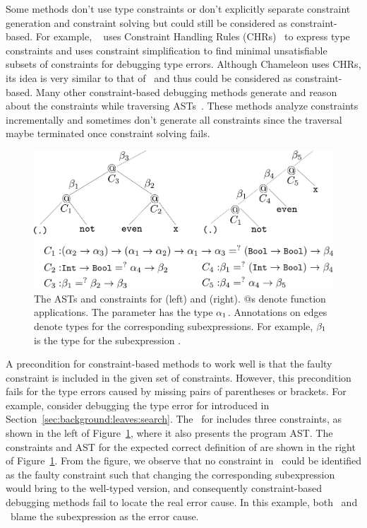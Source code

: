 \documentclass[12pt]{report}	%
\begin{document}
Some methods don't use type constraints or don't
explicitly separate constraint generation and constraint
solving but could still be considered as
constraint-based. For example,
\toolCh~\cite{Stuckey03:ITD,Stuckey04:ITE,Wazny06:TIT}
uses Constraint Handling Rules (CHRs)~\cite{CHR}
to express type constraints and uses constraint
simplification to find minimal unsatisfiable
subsets of constraints for debugging type errors.
Although Chameleon uses CHRs, its idea is very
similar to that of \toolMin\ and thus could be considered
as constraint-based. Many other constraint-based debugging methods
generate and reason about the constraints while traversing
ASTs~\cite{Lee98:PAF,Lee00:GLP,Mcadam98:UST,Yang00:ETE,Wand86:FST,Duggan95:ETI,Chitil01:CET}.
%
These methods analyze constraints incrementally and
sometimes don't generate all constraints since the traversal
maybe terminated once constraint solving fails. 

\begin{figure}
\centering
\includegraphics[width=0.85\columnwidth]{images/nonstruc.pdf}
\caption[Illustration of non-leaf type error.]{The ASTs and constraints for  (left)
and  (right).
\ensuremath{@}s denote function applications.
The parameter  has the type $\alpha_1$.
Annotations on edges denote types for the corresponding
subexpressions. For example, $\beta_1$ is the type for the
subexpression .}
\label{fig:nonstruc}
\end{figure}

A precondition for
constraint-based methods to work well is that the
faulty constraint is included in the given set of
constraints. However, this precondition fails
for the type errors caused by missing pairs of parentheses
or brackets.
For example,
consider debugging the type error for 
introduced in Section~\ref{sec:background:leaves:search}.
The \cs\ for  includes three constraints,
as shown in the left of Figure~\ref{fig:nonstruc}, where it
also presents the program AST. The constraints and AST for the
expected correct definition of  are shown in
the right of Figure~\ref{fig:nonstruc}. From the figure,
we observe that no constraint in \cs\ could be identified
as the faulty constraint such that changing the corresponding
subexpression would bring  to the
well-typed version, and consequently constraint-based debugging
methods fail to locate the real error cause. In this example,
both \toolH\ and \toolS\ blame the subexpression 
as the error cause.
\end{document}
